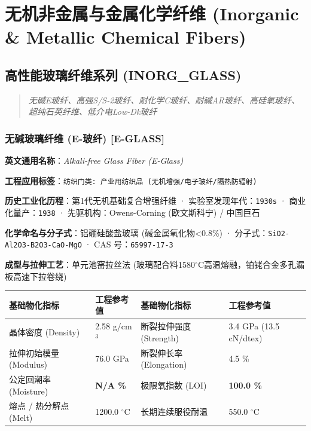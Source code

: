 \documentclass[11pt,openright,twoside,UTF8]{ctexbook}
\begin{document}
\part{无机非金属与金属化学纤维 (Inorganic \& Metallic Chemical Fibers)}

\chapter{高性能玻璃纤维系列 (INORG\_GLASS)}
\begin{quote}
\small\itshape
无碱E玻纤、高强S/S-2玻纤、耐化学C玻纤、耐碱AR玻纤、高硅氧玻纤、超纯石英纤维、低介电Low-Dk玻纤
\end{quote}

\section{无碱玻璃纤维 (E-玻纤) [E-GLASS]}
\label{sec:e-glass}

\noindent\textbf{英文通用名称}：\textit{Alkali-free Glass Fiber (E-Glass)}\par
\noindent\textbf{工程应用标签}：\texttt{纺织门类: 产业用纺织品 (无机增强/电子玻纤/隔热防辐射)}\par
\noindent\textbf{历史工业化历程}：第1代无机基础复合增强纤维 · 实验室发现年代：\texttt{1930s} · 商业化量产：\texttt{1938} · 先驱机构：Owens-Corning (欧文斯科宁) / 中国巨石\par
\noindent\textbf{化学命名与分子式}：铝硼硅酸盐玻璃 (碱金属氧化物\textless{}0.8\%) · 分子式：\texttt{SiO2-Al2O3-B2O3-CaO-MgO} · CAS 号：\texttt{65997-17-3}\par
\noindent\textbf{成型与拉伸工艺}：单元池窑拉丝法 (玻璃配合料1580$^\circ\mathrm{C}$高温熔融，铂铑合金多孔漏板高速下拉卷绕)\par

\vspace{0.15cm}
\begin{center}
\small
\begin{tabularx}{\textwidth}{p{3.8cm}Xp{3.8cm}X}
\toprule
\textbf{基础物化指标} & \textbf{工程参考值} & \textbf{基础物化指标} & \textbf{工程参考值} \\
\midrule
晶体密度 (Density) & 2.58 g/cm$^3$ & 断裂拉伸强度 (Strength) & 3.4 GPa (13.5 cN/dtex) \\
拉伸初始模量 (Modulus) & 76.0 GPa & 断裂伸长率 (Elongation) & 4.5 \% \\
公定回潮率 (Moisture) & \textbf{N/A \%} & 极限氧指数 (LOI) & \textbf{100.0 \%} \\
熔点 / 热分解点 (Melt) & 1200.0 $^\circ\mathrm{C}$ & 长期连续服役耐温 & 550.0 $^\circ\mathrm{C}$ \\
\bottomrule
\end{tabularx}
\end{center}
\vspace{0.15cm}
\end{document}
